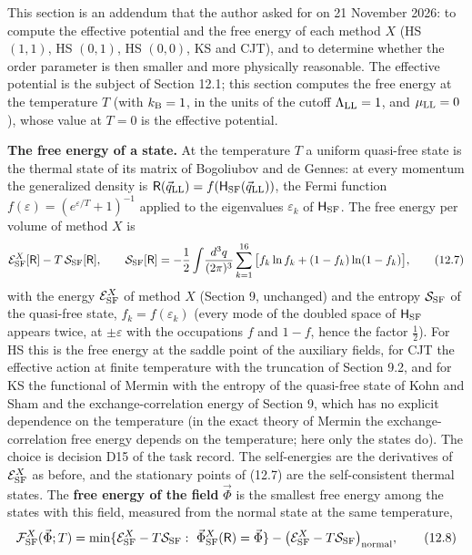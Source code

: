 \documentclass[
  10pt,
]{article}
\begin{document}
This section is an addendum that the author asked for on 21 November
2026: to compute the effective potential and the free energy of each
method \(X\) (HS \((1,1)\), HS \((0,1)\), HS \((0,0)\), KS and CJT), and
to determine whether the order parameter is then smaller and more
physically reasonable. The effective potential is the subject of Section
12.1; this section computes the free energy at the temperature \(T\)
(with \(k_{\rm B}=1\), in the units of the cutoff
\(\Lambda_{\rm LL}=1\), and \(\mu_{\rm LL}=0\)), whose value at \(T=0\)
is the effective potential.

\textbf{The free energy of a state.} At the temperature \(T\) a uniform
quasi-free state is the thermal state of its matrix of Bogoliubov and de
Gennes: at every momentum the generalized density is
\(\mathsf R(\vec q_{\rm LL})=f(\mathsf H_{\rm SF}(\vec q_{\rm LL}))\),
the Fermi function \(f(\varepsilon)=(e^{\varepsilon/T}+1)^{-1}\) applied
to the eigenvalues \(\varepsilon_k\) of \(\mathsf H_{\rm SF}\). The free
energy per volume of method \(X\) is
\[\mathcal E^X_{\rm SF}[\mathsf R]-T\,\mathcal S_{\rm SF}[\mathsf R],\qquad\mathcal S_{\rm SF}[\mathsf R]=-\frac12\int\!\frac{d^3q}{(2\pi)^3}\sum_{k=1}^{16}\big[f_k\ln f_k+(1-f_k)\ln(1-f_k)\big],\tag{12.7}\]
with the energy \(\mathcal E^X_{\rm SF}\) of method \(X\) (Section 9,
unchanged) and the entropy \(\mathcal S_{\rm SF}\) of the quasi-free
state, \(f_k=f(\varepsilon_k)\) (every mode of the doubled space of
\(\mathsf H_{\rm SF}\) appears twice, at \(\pm\varepsilon\) with the
occupations \(f\) and \(1-f\), hence the factor \(\tfrac12\)). For HS
this is the free energy at the saddle point of the auxiliary fields, for
CJT the effective action at finite temperature with the truncation of
Section 9.2, and for KS the functional of Mermin with the entropy of the
quasi-free state of Kohn and Sham and the exchange-correlation energy of
Section 9, which has no explicit dependence on the temperature (in the
exact theory of Mermin the exchange-correlation free energy depends on
the temperature; here only the states do). The choice is decision D15 of
the task record. The self-energies are the derivatives of
\(\mathcal E^X_{\rm SF}\) as before, and the stationary points of (12.7)
are the self-consistent thermal states. The \textbf{free energy of the
field} \(\vec\Phi\) is the smallest free energy among the states with
this field, measured from the normal state at the same temperature,
\[\mathcal F^X_{\rm SF}(\vec\Phi;T)=\min\{\mathcal E^X_{\rm SF}-T\mathcal S_{\rm SF}:\ \vec\Phi^X_{\rm SF}(\mathsf R)=\vec\Phi\}-\big(\mathcal E^X_{\rm SF}-T\mathcal S_{\rm SF}\big)_{\rm normal},\tag{12.8}\]
\end{document}
